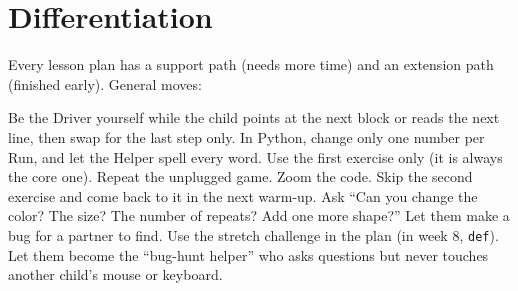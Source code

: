 \documentclass[track=junior,level=3,teacher]{kidscode}
\begin{document}
\section{Differentiation}
Every lesson plan has a support path (needs more time) and an extension path (finished early).
General moves:

\begin{differentiation}
\supportpath Be the Driver yourself while the child points at the next block or reads the next line,
then swap for the last step only. In Python, change only one number per Run, and let the Helper
spell every word. Use the first exercise only (it is always the core one). Repeat the unplugged game.
Zoom the code. Skip the second exercise and come back to it in the next warm-up.
\extensionpath Ask \enquote{Can you change the color? The size? The number of repeats? Add one more
shape?} Let them make a bug for a partner to find. Use the stretch challenge in the plan (in week 8,
\texttt{def}). Let them become the \enquote{bug-hunt helper} who asks questions but never touches
another child's mouse or keyboard.
\end{differentiation}
\end{document}
